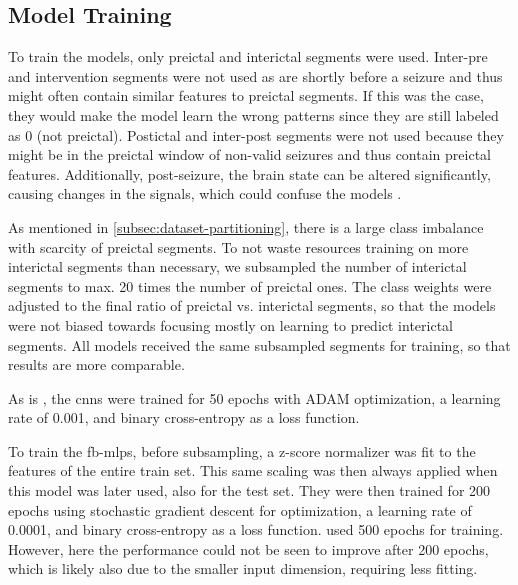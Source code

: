 \subsection{Model Training} \label{subsec:model-training}
To train the models, only preictal and interictal segments were used.
Inter-pre and intervention segments were not used as are shortly before a seizure and thus might often contain similar features to preictal segments.
If this was the case, they would make the model learn the wrong patterns since they are still labeled as 0 (not preictal).
Postictal and inter-post segments were not used because they might be in the preictal window of non-valid seizures and thus contain preictal features.
Additionally, post-seizure, the brain state can be altered significantly, causing changes in the signals, which could confuse the models \parencite{muller_coherent_2022}.

As mentioned in \cref{subsec:dataset-partitioning}, there is a large class imbalance with scarcity of preictal segments.
To not waste resources training on more interictal segments than necessary, we subsampled the number of interictal segments to max. 20 times the number of preictal ones.
The class weights were adjusted to the final ratio of preictal vs. interictal segments, so that the models were not biased towards focusing mostly on learning to predict interictal segments.
All models received the same subsampled segments for training, so that results are more comparable.

As is \textcite{eberlein_convolutional_2018}, the \glspl{cnn} were trained for 50 epochs with ADAM optimization, a learning rate of \num{0.001}, and binary cross-entropy as a loss function.

To train the \glspl{fb-mlp}, before subsampling, a z-score normalizer was fit to the features of the entire train set.
This same scaling was then always applied when this model was later used, also for the test set.
They were then trained for 200 epochs using stochastic gradient descent for optimization, a learning rate of \num{0.0001}, and binary cross-entropy as a loss function.
\Textcite{muller_coherent_2022} used 500 epochs for training.
However, here the performance could not be seen to improve after 200 epochs, which is likely also due to the smaller input dimension, requiring less fitting.
